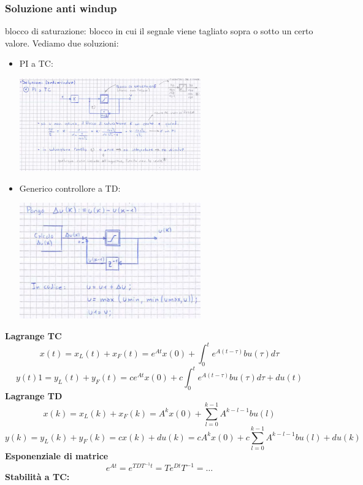 \begin{landscape}
\begin{multicols*}{2}
    \subsubsection{Soluzione anti windup}
    blocco di saturazione: blocco in cui il segnale viene tagliato sopra o sotto un certo valore.\newline
    Vediamo due soluzioni:
    \begin{itemize}
        \item PI a TC: \begin{center}
            \includegraphics[height=4cm]{../formulario/img11.JPG}
        \end{center}
        \item Generico controllore a TD: \begin{center}
            \includegraphics[height=5cm]{../formulario/img12.jpg}
        \end{center}
    \end{itemize}  
    \end{multicols*}
    \newpage
\begin{multicols*}{3}
\textbf{Lagrange TC}
\[
    x(t) = x_L(t) + x_F(t) =e^{At} x(0) + \int_{0}^{t}e^{A(t-\tau)}bu(\tau)d \tau
\]
\[
    y(t) 1 = y_L(t) + y_F(t) = ce^{At}x(0) + c \int_{0}^{t}e^{A(t-\tau)}bu(\tau)d \tau + du(t)
\]
\textbf{Lagrange TD}
\[
    x(k)= x_L(k) + x_F(k) =A^k x(0) + \sum_{l=0}^{k-1}A^{k-l-1}bu(l)
\]
\[
    y(k) = y_L(k) + y_F(k) = cx(k)+du(k) =cA^k x(0) + c\sum_{l=0}^{k-1}A^{k-l-1}bu(l) + du(k)
\]
\textbf{Esponenziale di matrice}
\[
    e^{At} = e^{TDT^{-1} t} = T e^{Dt} T^{-1} = \dots
\]
\textbf{Stabilità a TC:}
\begin{itemize}

\end{itemize}
\end{multicols*}
\end{landscape}
